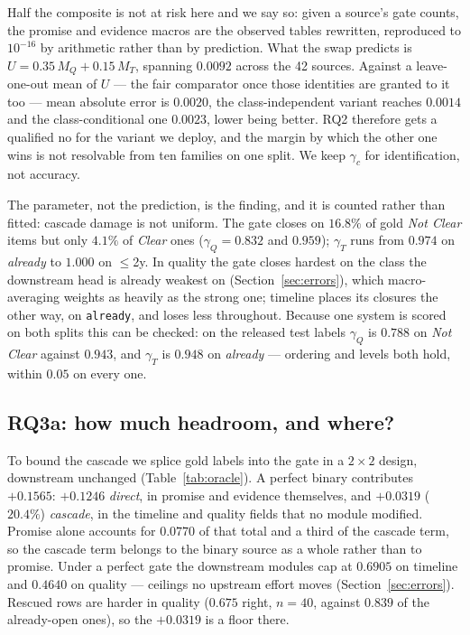 Half the composite is not at risk here and we say so: given a source's gate counts, the promise
and evidence macros are the observed tables rewritten, reproduced to $10^{-16}$ by arithmetic
rather than by prediction. What the swap predicts is $U = 0.35\,M_Q + 0.15\,M_T$, spanning
$0.0092$ across the 42 sources. Against a leave-one-out mean of $U$ --- the fair comparator once
those identities are granted to it too --- mean absolute error is $0.0020$, the class-independent
variant reaches $0.0014$ and the class-conditional one $0.0023$, lower being better. RQ2 therefore
gets a qualified no for the variant we deploy, and the margin by which the other one wins is not
resolvable from ten families on one split. We keep $\gamma_c$ for identification, not accuracy.

The parameter, not the prediction, is the finding, and it is counted rather than fitted: cascade
damage is not uniform. The gate closes on $16.8\%$ of gold \textit{Not Clear} items but only
$4.1\%$ of \textit{Clear} ones ($\gamma_Q = 0.832$ and $0.959$); $\gamma_T$ runs from $0.974$ on
\textit{already} to $1.000$ on $\le$2y. In quality the gate closes hardest on the class the
downstream head is already weakest on (Section~\ref{sec:errors}), which macro-averaging weights as
heavily as the strong one; timeline places its closures the other way, on \texttt{already}, and
loses less throughout. Because one system is scored on both splits this can be checked: on the
released test labels $\gamma_Q$ is $0.788$ on \textit{Not Clear} against $0.943$, and $\gamma_T$ is $0.948$ on
\textit{already} --- ordering and levels both hold, within $0.05$ on every one.

\subsection{RQ3a: how much headroom, and where?}
\label{sec:res:oracle}

To bound the cascade we splice gold labels into the gate in a $2\times2$ design, downstream
unchanged (Table~\ref{tab:oracle}). A perfect binary contributes $+0.1565$: $+0.1246$
\emph{direct}, in promise and evidence themselves, and $+0.0319$ ($20.4\%$) \emph{cascade}, in
the timeline and quality fields that no module modified. Promise alone accounts for $0.0770$ of
that total and a third of the cascade term, so the cascade term belongs to the binary source as a
whole rather than to promise. Under a perfect gate the downstream modules cap
at $0.6905$ on timeline and $0.4640$ on quality --- ceilings no upstream effort moves
(Section~\ref{sec:errors}). Rescued rows are harder in quality ($0.675$ right, $n{=}40$, against $0.839$ of
the already-open ones), so the $+0.0319$ is a floor there.

